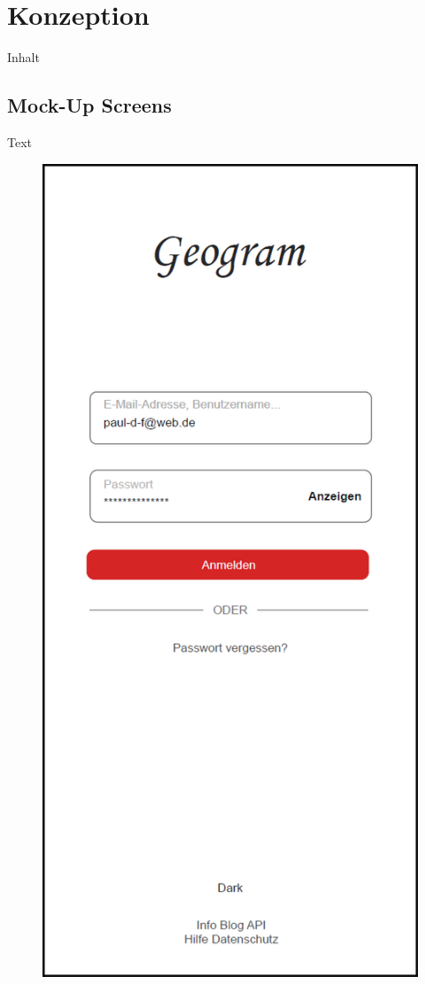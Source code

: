 \chapter{Konzeption\label{chap2:Zweites-Kapitel}}

Inhalt

\section{Mock-Up Screens\label{sec2.1:Unterpunkt-1}}

Text

\begin{figure}[H]
    \centering
    \begin{minipage}{.5\textwidth}
      \centering
      \includegraphics[width=.8\linewidth]{images/Login_MockUp.png}

\end{minipage}
\end{figure}
